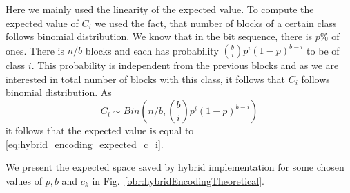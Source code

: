 Here we mainly used the linearity of the expected value. To compute the expected value of
$C_i$ we used the fact, that number of blocks of a certain class follows binomial
distribution. We know that in the bit sequence, there is $p\%$ of ones. There is $n/b$ blocks
and each has probability ${b\choose i}p^i(1-p)^{b-i}$ to be of class $i$. This probability
is independent from the previous blocks and as we are interested in total number of blocks with
this class, it follows that $C_i$ follows binomial distribution. As
$$C_i \sim Bin\left(n/b, {b\choose i}p^i(1-p)^{b-i}\right)$$ it follows that the expected value
is equal to \ref{eq:hybrid_encoding_expected_c_i}.

We present the expected space saved by hybrid implementation for some chosen values of
$p, b$ and $c_k$ in Fig.~\ref{obr:hybridEncodingTheoretical}.
